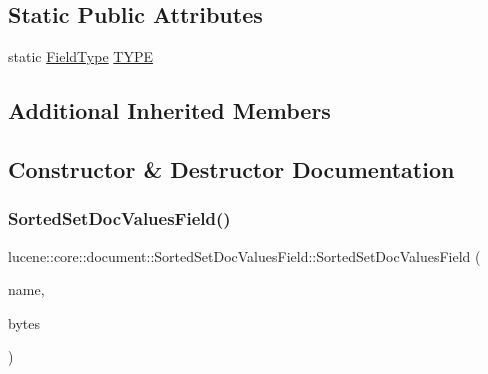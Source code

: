 \subsection*{Static Public Attributes}
\begin{DoxyCompactItemize}
\item 
static \mbox{\hyperlink{classlucene_1_1core_1_1document_1_1FieldType}{Field\+Type}} \mbox{\hyperlink{classlucene_1_1core_1_1document_1_1SortedSetDocValuesField_a93e0580ec4096f4c19090699aab8d5e9}{T\+Y\+PE}}
\end{DoxyCompactItemize}
\subsection*{Additional Inherited Members}


\subsection{Constructor \& Destructor Documentation}
\mbox{\label{classlucene_1_1core_1_1document_1_1SortedSetDocValuesField_a606d942fd2669a07d9ed7fa7575e7248}} 
\subsubsection{\texorpdfstring{Sorted\+Set\+Doc\+Values\+Field()}{SortedSetDocValuesField()}\hspace{0.1cm}{\footnotesize\ttfamily [1/2]}}
{\footnotesize\ttfamily lucene\+::core\+::document\+::\+Sorted\+Set\+Doc\+Values\+Field\+::\+Sorted\+Set\+Doc\+Values\+Field (\begin{DoxyParamCaption}\item[{const std\+::string \&}]{name,  }\item[{const \mbox{\hyperlink{classlucene_1_1core_1_1util_1_1BytesRef}{lucene\+::core\+::util\+::\+Bytes\+Ref}} \&}]{bytes }\end{DoxyParamCaption})\hspace{0.3cm}{\ttfamily [inline]}}

